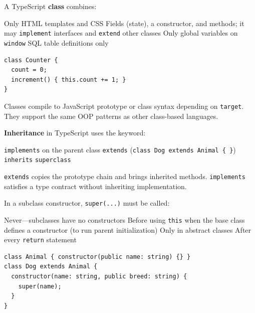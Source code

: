 \question[4]
A TypeScript \textbf{class} combines:
\begin{choices}
  \choice Only HTML templates and CSS
  \CorrectChoice Fields (state), a constructor, and methods; it may \lstinline[style=tsinline]|implement| interfaces and \lstinline[style=tsinline]|extend| other classes
  \choice Only global variables on \lstinline[style=tsinline]|window|
  \choice SQL table definitions only
\end{choices}
\begin{solution}
\begin{lstlisting}[style=ts]
class Counter {
  count = 0;
  increment() { this.count += 1; }
}
\end{lstlisting}
  Classes compile to JavaScript prototype or class syntax depending on \texttt{target}. They support the same OOP patterns as other class-based languages.
\end{solution}

\question[4]
\textbf{Inheritance} in TypeScript uses the keyword:
\begin{choices}
  \choice \lstinline[style=tsinline]|implements| on the parent class
  \CorrectChoice \lstinline[style=tsinline]|extends| (\lstinline[style=tsinline]|class Dog extends Animal { }|)
  \choice \lstinline[style=tsinline]|inherits|
  \choice \lstinline[style=tsinline]|superclass|
\end{choices}
\begin{solution}
  \lstinline[style=tsinline]|extends| copies the prototype chain and brings inherited methods. \lstinline[style=tsinline]|implements| satisfies a type contract without inheriting implementation.
\end{solution}

\question[4]
In a subclass constructor, \lstinline[style=tsinline]|super(...)| must be called:
\begin{choices}
  \choice Never---subclasses have no constructors
  \CorrectChoice Before using \lstinline[style=tsinline]|this| when the base class defines a constructor (to run parent initialization)
  \choice Only in abstract classes
  \choice After every \lstinline[style=tsinline]|return| statement
\end{choices}
\begin{solution}
\begin{lstlisting}[style=ts]
class Animal { constructor(public name: string) {} }
class Dog extends Animal {
  constructor(name: string, public breed: string) {
    super(name);
  }
}
\end{lstlisting}
\end{solution}

